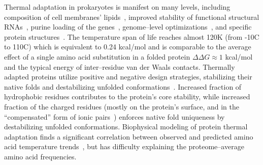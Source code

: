 \documentclass[10pt,letterpaper]{article}
\begin{document}
Thermal adaptation in prokaryotes is manifest on many levels, including composition of cell membranes' lipids~\cite{Chugunov2014Liquid},  improved stability of functional structural RNAs~\cite{Galtier1997Relationships}, purine loading of the genes~\cite{Lambros2003Optimum},  genome--level optimizations~\cite{Sabath2013Growth,Saha2015Overlapping},  and specific protein structures~\cite{Szilagyi2000Structural,England2003Natural}. The temperature span of life reaches almost 120K (from -10\textdegree C to 110\textdegree C) which is equivalent to 0.24 kcal/mol and is comparable to the average effect of a single amino acid substitution in a folded protein $\Delta\Delta G\approx 1$ kcal/mol~\cite{Zeldovich2007Proteinb} and the typical energy of inter--residue van der Waals contacts. Thermally adapted proteins utilize positive and negative design strategies, stabilizing their native folds and destabilizing unfolded conformations~\cite{Berezovsky2007Positive}. Increased fraction of hydrophobic residues contributes to the protein's core stability, while increased fraction of the charged residues (mostly on the protein's surface, and in the ``compensated'' form of ionic pairs~\cite{Szilagyi2000Structural,Zhao2011Charged}) enforces native fold uniqueness by destabilizing unfolded conformations.  Biophysical modeling of protein thermal adaptation finds a significant correlation between observed and predicted amino acid temperature trends~\cite{Berezovsky2007Positive,Venev2015Massively}, but has difficulty explaining the proteome--average amino acid frequencies.
\end{document}
